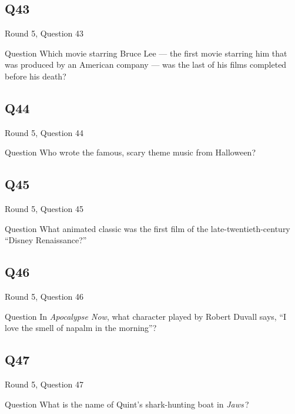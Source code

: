 \documentclass[11pt]{beamer}
\begin{document}
\subsection*{Q43}
\begin{frame}[t]{Round 5, Question 43}
\vspace{2em}
\begin{block}{Question}
Which movie starring Bruce Lee — the first movie starring him that was produced by an American company — was the last of his films completed before his death?
\end{block}
\end{frame}
    

\subsection*{Q44}
\begin{frame}[t]{Round 5, Question 44}
\vspace{2em}
\begin{block}{Question}
Who wrote the famous, scary theme music from Halloween?
\end{block}
\end{frame}
    

\subsection*{Q45}
\begin{frame}[t]{Round 5, Question 45}
\vspace{2em}
\begin{block}{Question}
What animated classic was the first film of the late-twentieth-century ``Disney Renaissance?''
\end{block}
\end{frame}
    

\subsection*{Q46}
\begin{frame}[t]{Round 5, Question 46}
\vspace{2em}
\begin{block}{Question}
In \emph{Apocalypse Now}, what character played by Robert Duvall says, ``I love the smell of napalm in the morning''?
\end{block}
\end{frame}
    

\subsection*{Q47}
\begin{frame}[t]{Round 5, Question 47}
\vspace{2em}
\begin{block}{Question}
What is the name of Quint's shark-hunting boat in \emph{Jaws}\,?
\end{block}
\end{frame}
    
\end{document}
